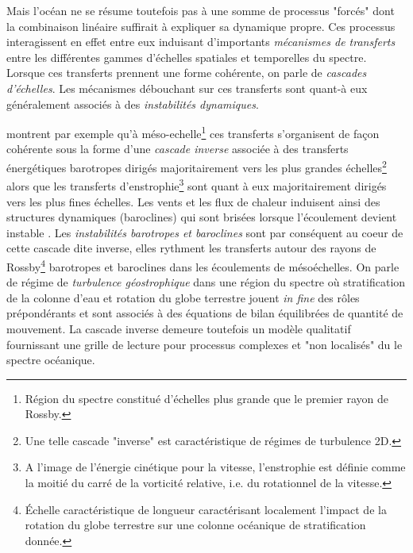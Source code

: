 



Mais l'océan ne se résume toutefois pas à une somme de processus "forcés" dont la combinaison linéaire suffirait à expliquer sa dynamique propre. Ces processus interagissent en effet entre eux induisant d'importants \textit {mécanismes de transferts} entre les différentes gammes d'échelles spatiales et temporelles \color{red}du spectre. Lorsque ces transferts prennent une forme cohérente\color{black}, on parle de \textit{cascades d'échelles}. Les mécanismes débouchant sur ces transferts sont quant-à eux généralement associés à des \textit{instabilités dynamiques}.

\color{blue}
\cite{salmon_baroclinic_1980} montrent par exemple qu'à méso-echelle\footnote{Région du spectre constitué d'échelles plus grande que le premier rayon de Rossby.} ces transferts s'organisent de façon cohérente sous la forme d'une \textit{cascade inverse} associée à des transferts énergétiques barotropes dirigés majoritairement vers les plus grandes échelles\footnote{Une telle cascade "inverse" est caractéristique de régimes de turbulence 2D.} alors que les transferts d'enstrophie\footnote{A l'image de l'énergie cinétique pour la vitesse, l'enstrophie est définie comme la moitié du carré de la vorticité relative, i.e. du rotationnel de la vitesse.} sont quant à eux majoritairement dirigés vers les plus fines échelles. 
Les vents et les flux de chaleur induisent ainsi des structures dynamiques (baroclines) qui sont brisées lorsque l'écoulement devient instable \citep{vallis_atmospheric_2006}.
Les \textit{instabilités barotropes et baroclines} sont par conséquent au coeur de cette cascade dite inverse, elles rythment les transferts autour des rayons de Rossby\footnote{Échelle caractéristique de longueur caractérisant localement l'impact de la rotation du globe terrestre sur une colonne océanique de stratification donnée.} barotropes et baroclines dans les écoulements de mésoéchelles. On parle de régime de \textit{turbulence géostrophique} \citep{charney_geostrophic_1971} dans une région du spectre où stratification de la colonne d'eau et rotation du globe terrestre jouent \textit{in fine} des rôles prépondérants et sont associés à des équations de bilan équilibrées de quantité de mouvement. La cascade inverse demeure toutefois un modèle qualitatif fournissant une grille de lecture pour processus complexes et "non localisés" du le spectre océanique.

